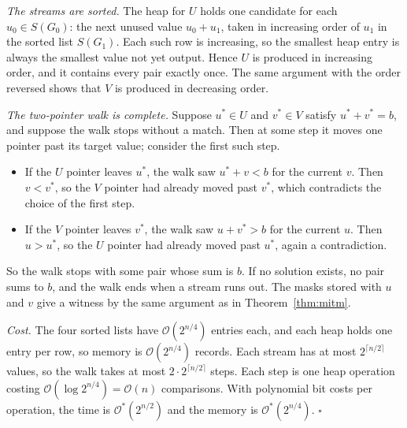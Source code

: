 \documentclass[conference]{IEEEtran}
\newcommand{\Oh}{\mathcal{O}}
\begin{document}
\emph{The streams are sorted.} The heap for $U$ holds one candidate for each
$u_0\in S(G_0)$: the next unused value $u_0+u_1$, taken in increasing order of
$u_1$ in the sorted list $S(G_1)$. Each such row is increasing, so the smallest
heap entry is always the smallest value not yet output. Hence $U$ is produced in
increasing order, and it contains every pair exactly once. The same argument
with the order reversed shows that $V$ is produced in decreasing order.

\emph{The two-pointer walk is complete.} Suppose $u^\ast\in U$ and
$v^\ast\in V$ satisfy $u^\ast+v^\ast=b$, and suppose the walk stops without a
match. Then at some step it moves one pointer past its target value; consider
the first such step.
\begin{itemize}
\item If the $U$ pointer leaves $u^\ast$, the walk saw $u^\ast+v<b$ for the
current $v$. Then $v<v^\ast$, so the $V$ pointer had already moved past
$v^\ast$, which contradicts the choice of the first step.
\item If the $V$ pointer leaves $v^\ast$, the walk saw $u+v^\ast>b$ for the
current $u$. Then $u>u^\ast$, so the $U$ pointer had already moved past
$u^\ast$, again a contradiction.
\end{itemize}
So the walk stops with some pair whose sum is $b$. If no solution exists, no
pair sums to $b$, and the walk ends when a stream runs out. The masks stored
with $u$ and $v$ give a witness by the same argument as in
Theorem~\ref{thm:mitm}.

\emph{Cost.} The four sorted lists have $\Oh(2^{n/4})$ entries each, and each
heap holds one entry per row, so memory is $\Oh(2^{n/4})$ records. Each stream
has at most $2^{\lceil n/2\rceil}$ values, so the walk takes at most
$2\cdot2^{\lceil n/2\rceil}$ steps. Each step is one heap operation costing
$\Oh(\log 2^{n/4})=\Oh(n)$ comparisons. With polynomial bit costs per
operation, the time is $\Oh^*(2^{n/2})$ and the memory is $\Oh^*(2^{n/4})$.
\hfill$\square$
\end{document}
